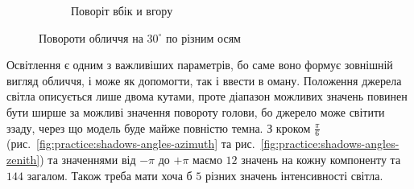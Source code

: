 \begin{figure}[h]
\begin{subfigure}[b]{0.3\textwidth}
    \caption{Поворіт вбік и вгору}
  \end{subfigure}
  \caption{Повороти обличчя на $30^{\circ}$ по різним осям}
  \label{fig:practice:angles}
\end{figure}

Освітлення є одним з важливіших параметрів,
бо саме воно формує зовнішній вигляд обличчя,
і може як допомогти, так і ввести в оману.
Положення джерела світла описується лише двома кутами,
проте діапазон можливих значень повинен бути ширше
за можливі значення повороту голови,
бо джерело може світити ззаду, через що модель буде майже повністю темна.
З кроком $\frac{\pi}{6}$
(рис.~\ref{fig:practice:shadows-angles-azimuth}
та рис.~\ref{fig:practice:shadows-angles-zenith})
та значеннями від $-\pi$ до $+\pi$
маємо $12$ значень на кожну компоненту та $144$ загалом.
Також треба мати хоча б $5$ різних значень інтенсивності світла.
